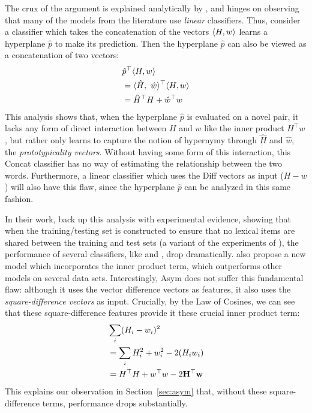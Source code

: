 \documentclass[12pt]{article}
\begin{document}
The crux of the argument is explained analytically by
, and hinges on observing that many of the models from
the literature use {\em linear} classifiers. Thus, consider a
classifier which takes the concatenation of the vectors $\langle H, w\rangle$ learns a
hyperplane $\hat p$ to make its prediction. Then the hyperplane $\hat p$ can
also be viewed as a concatenation of two vectors:
\begin{align*}
  & \hat p^\top \langle H, w\rangle\\
  & = \langle \hat H,~\hat w\rangle^\top \langle H, w\rangle\\
  & = \hat H^\top H + \hat w^\top w
\end{align*}
This analysis shows that, when the hyperplane $\hat p$ is evaluated on a novel
pair, it lacks any form of direct interaction between $H$ and $w$ like the
inner product $H^\top w$, but rather only learns to capture the notion of
hypernymy through $\hat H$ and $\hat w$, the {\em prototypicality vectors}.
Without having some form of this interaction, this Concat classifier has no way
of estimating the relationship between the two words. Furthermore, a linear classifier
which uses the Diff vectors as input ($H - w$) will also have this flaw,
since the hyperplane $\hat p$ can be analyzed in this same fashion.

In their work,  back up this analysis with experimental
evidence, showing that when the training/testing set is constructed to
ensure that no lexical items are shared between the training and test sets
(a variant of the experiments of ), the performance
of several classifiers, like  and
, drop dramatically.  also
propose a new model which incorporates the inner product term, which
outperforms other models on several data sets.
Interestingly, Asym does not suffer this fundamental flaw: although it uses the
vector difference vectors as features, it also uses the {\em square-difference
vectors} as input. Crucially, by the Law of Cosines, we can see that these
square-difference features provide it these crucial inner product term:
\begin{align*}
  & \sum_i (H_i - w_i)^2\\
  & = \sum_i H_i^2 + w_i^2 - 2({H}_i{w}_i)\\
  & = H^\top H + w^\top w - 2{\bf H^\top{w}}
\end{align*}
This explains our observation in Section~\ref{sec:asym} that, without these
square-difference terms, performance drops substantially.
\end{document}
